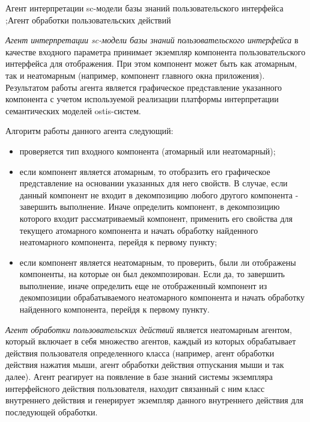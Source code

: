 \begin{SCn}
	
\scnsectionheader{\currentname}
	
\scnstartsubstruct


	 {
		Агент интерпретации sc-модели базы знаний пользовательского интерфейса
		;Агент обработки пользовательских действий
	}

\textit{Агент интерпретации sc-модели базы знаний пользовательского интерфейса} в качестве входного параметра принимает экземпляр компонента пользовательского интерфейса для отображения. При этом компонент может быть как атомарным, так и неатомарным (например, компонент главного окна приложения). Результатом работы агента является графическое представление указанного компонента с учетом используемой реализации платформы интерпретации семантических моделей ostis-систем.

Алгоритм работы данного агента следующий:
\begin{itemize}
	\item проверяется тип входного компонента (атомарный или неатомарный);
	\item если компонент является атомарным, то отобразить его графическое представление на основании указанных для него свойств. В случае, если данный компонент не входит в декомпозицию любого другого компонента - завершить выполнение. Иначе определить компонент, в декомпозицию которого входит рассматриваемый компонент, применить его свойства для текущего атомарного компонента и начать обработку найденного неатомарного компонента, перейдя к первому пункту;
	\item если компонент является неатомарным, то проверить, были ли отображены компоненты, на которые он был декомпозирован. Если да, то завершить выполнение, иначе определить еще не отображенный компонент из декомпозиции обрабатываемого неатомарного компонента и начать обработку найденного компонента, перейдя к первому пункту.
\end{itemize}

\textit{Агент обработки пользовательских действий} является неатомарным агентом, который включает в себя множество агентов, каждый из которых обрабатывает действия пользователя определенного класса (например, агент обработки действия нажатия мыши, агент обработки действия отпускания мыши и так далее). Агент реагирует на появление в базе знаний системы экземпляра интерфейсного действия пользователя, находит связанный с ним класс внутреннего действия и генерирует экземпляр данного внутреннего действия для последующей обработки.




\end{SCn}
